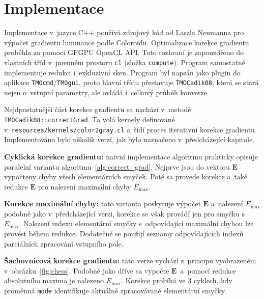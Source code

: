 \documentclass[11pt,a4paper,oneside]{article}
\begin{document}
	\section{Implementace}
	Implementace v~jazyce C++ používá zdrojový kód od Laszla Neumanna pro výpočet gradientu luminance
	podle Coloroidu. Optimalizace korekce gradientu proběhla za pomoci GPGPU OpenCL API. Toto rozhraní
	je zapouzdřeno do vlastních tříd v~jmenném prostoru \texttt{cl} (složka \texttt{compute}). Program
	samostatně implementuje redukci i~exkluzivní sken. Program byl napsán jako plugin do aplikace
	\texttt{TMOcmd}/\texttt{TMOgui}, proto hlavní třídu přestavuje \texttt{TMOCadik08},
	která se stará nejen o~vstupní parametry, ale ovládá i~celkový průběh konverze.

	Nejdpostatnější část korekce gradientu sa nachází v~metodě \\
	\texttt{TMOCadik08::correctGrad}. Ta volá kernely definované \\
	v~\texttt{resources/kernels/color2gray.cl} a~řídí proces iterativní
	korekce gradientu. Implementováno bylo několik verzí, jak bylo naznačeno v~předcházející kapitole.

	\textbf{Cyklická korekce gradientu:} \; naivní implementace algoritmu prakticky opisuje
	paralelní variantu algoritmu~\ref{alg:correct_grad}. Nejprve jsou do vektoru $\textbf{E}$
	vypočteny chyby všech elementárních smyček. Poté sa provede korekce a~také redukce $\textbf{E}$
	pro nalezení maximální chyby $E_{\max}$.

	\textbf{Korekce maximální chyby:} \; tato varianta poskytuje výpočet $\textbf{E}$ a~nalezení
	$E_{\max}$ podobně jako v~předcházející verzi, korekce se však provádí jen pro smyčku s~$E_{\max}$.
	Nalezení indexu elementární smyčky s~odpovídající maximální chybou lze provést během redukce.
	Dodatečně se použijí seznamy odpovídajících indexů parciálních zpracování vstupního pole.

	\textbf{Šachovnicová korekce gradientu:} \; tato verze vychází z~principu vyobrazeném
	v~obrázku~\ref{fig:chess}. Podobně jako dříve sa vypočte $\textbf{E}$ a~pomocí redukce absolutního maxima
	je nalezeno $E_{\max}$. Korekce probíhá ve 3 cyklech, kdy proměnná \texttt{mode} identifikuje aktuálně
	zpracovávané elementární smyčky.
\end{document}

